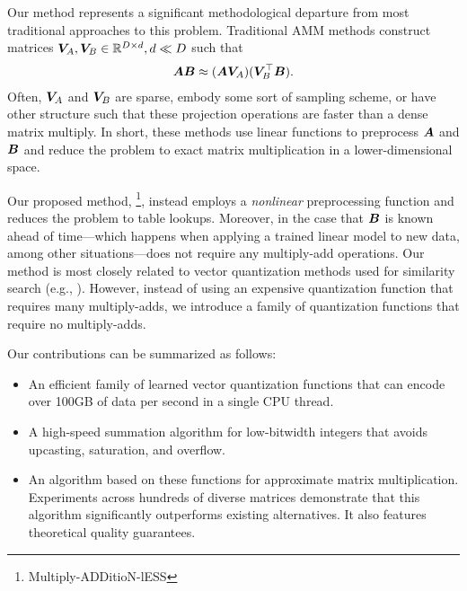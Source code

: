 
Our method represents a significant methodological departure from most traditional approaches to this problem. Traditional AMM methods construct matrices $\bm{V}_A, \bm{V}_B \in \mathbb{R}^{D \times d}, d \ll D$ such that
\begin{align}
    \bm{A} \bm{B} \approx (\bm{A} \bm{V}_A) (\bm{V}_B^\top \bm{B}).
\end{align}
Often, $\bm{V}_A$ and $\bm{V}_B$ are sparse, embody some sort of sampling scheme, or have other structure such that these projection operations are faster than a dense matrix multiply. In short, these methods use linear functions to preprocess $\bm{A}$ and $\bm{B}$ and reduce the problem to exact matrix multiplication in a lower-dimensional space.

Our proposed method, \ours\footnote{Multiply-ADDitioN-lESS}, instead employs a \textit{nonlinear} preprocessing function and reduces the problem to table lookups. Moreover, in the case that $\bm{B}$ is known ahead of time---which happens when applying a trained linear model to new data, among other situations---\oursp does not require any multiply-add operations.
Our method is most closely related to vector quantization methods used for similarity search (e.g., \cite{bolt,quickAdc,quickerAdc,pq,opq}). However, instead of using an expensive quantization function that requires many multiply-adds, we introduce a family of quantization functions that require no multiply-adds. %

Our contributions can be summarized as follows:
\vspace{-3mm}
\begin{itemize}\itemsep-1mm
    \item An efficient family of learned vector quantization functions that can encode over 100GB of data per second in a single CPU thread.
    \item A high-speed summation algorithm for low-bitwidth integers that avoids upcasting, saturation, and overflow.
    \item An algorithm based on these functions for approximate matrix multiplication. Experiments across hundreds of diverse matrices demonstrate that this algorithm significantly outperforms existing alternatives. It also features theoretical quality guarantees.
\end{itemize}
\vspace{-3mm}

